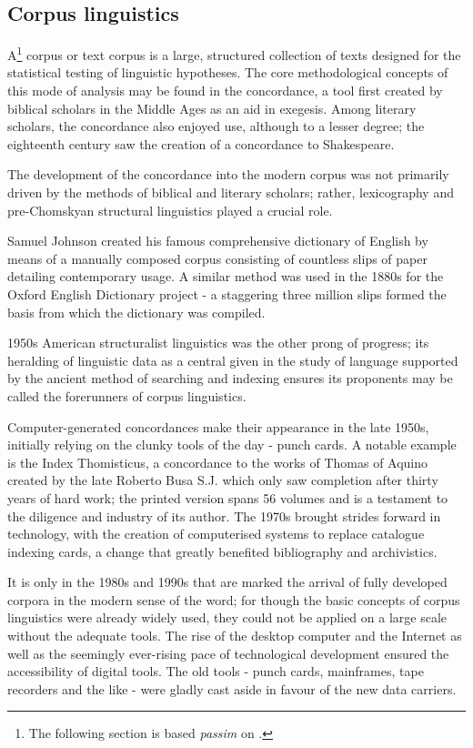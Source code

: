 \subsection{Corpus linguistics} A\footnote{The following section is
based \emph{passim} on \citet{okeeffe2010}.} corpus or text corpus is
a large, structured collection of texts designed for the statistical
testing of linguistic hypotheses. The core methodological concepts of
this mode of analysis may be found in the concordance, a tool first
created by biblical scholars in the Middle Ages as an aid in
exegesis. Among literary scholars, the concordance also enjoyed use,
although to a lesser degree; the eighteenth century saw the creation
of a concordance to Shakespeare.

The development of the concordance into the modern corpus was not
primarily driven by the methods of biblical and literary scholars;
rather, lexicography and pre-Chomskyan structural linguistics played a
crucial role.

Samuel Johnson created his famous comprehensive dictionary of English
by means of a manually composed corpus consisting of countless slips
of paper detailing contemporary usage. A similar method was used in
the 1880s for the Oxford English Dictionary project - a staggering
three million slips formed the basis from which the dictionary was
compiled.

1950s American structuralist linguistics was the other prong of
progress; its heralding of linguistic data as a central given in the
study of language supported by the ancient method of searching and
indexing ensures its proponents may be called the forerunners of
corpus linguistics.

Computer-generated concordances make their appearance in the late
1950s, initially relying on the clunky tools of the day - punch
cards. A notable example is the Index Thomisticus, a concordance to
the works of Thomas of Aquino created by the late Roberto Busa
S.J. which only saw completion after thirty years of hard work; the
printed version spans 56 volumes and is a testament to the diligence
and industry of its author. The 1970s brought strides forward in
technology, with the creation of computerised systems to replace
catalogue indexing cards, a change that greatly benefited bibliography
and archivistics.

It is only in the 1980s and 1990s that are marked the arrival of fully
developed corpora in the modern sense of the word; for though the
basic concepts of corpus linguistics were already widely used, they
could not be applied on a large scale without the adequate tools. The
rise of the desktop computer and the Internet as well as the seemingly
ever-rising pace of technological development ensured the
accessibility of digital tools.  The old tools - punch cards,
mainframes, tape recorders and the like - were gladly cast aside in
favour of the new data carriers.

